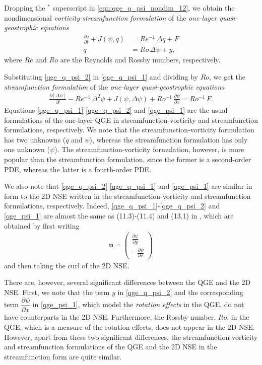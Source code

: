Dropping the $^*$ superscript in \eqref{eqn:qge_q_psi_nondim_12}, we obtain the
nondimensional {\it vorticity-streamfunction formulation} of the \emph{one-layer
quasi-geostrophic equations}
\begin{align}
  \frac{\partial q}{\partial t} + J(\psi , q) &= Re^{-1} \, \Delta q + F \label{qge_q_psi_1} \\
  q &= Ro \, \Delta \psi + y, \label{qge_q_psi_2}
\end{align}
where $Re$ and $Ro$ are the Reynolds and Rossby numbers, respectively.

Substituting \eqref{qge_q_psi_2} in \eqref{qge_q_psi_1} and dividing by $Ro$, we
get the {\it streamfunction formulation} of the \emph{one-layer quasi-geostrophic
equations}
\begin{align}
  \frac{\partial \left[ \Delta \psi \right]}{\partial t} - Re^{-1} \, \Delta^2 \psi + J(\psi
    , \Delta \psi) + Ro^{-1} \, \frac{\partial \psi}{\partial x} = Ro^{-1} \, F. \label{qge_psi_1}
\end{align}
Equations \eqref{qge_q_psi_1}-\eqref{qge_q_psi_2} and \eqref{qge_psi_1} are the
usual formulations of the one-layer QGE in streamfunction-vorticity and
streamfunction formulations, respectively. We note that the
streamfunction-vorticity formulation has two unknowns ($q$ and $\psi$), whereas
the streamfunction formulation has only one unknown ($\psi$). The
streamfunction-vorticity formulation, however, is more popular than the
streamfunction formulation, since the former is a second-order PDE, whereas the
latter is a fourth-order PDE.

We also note that \eqref{qge_q_psi_2}-\eqref{qge_q_psi_1} and \eqref{qge_psi_1}
are similar in form to the 2D NSE written in the streamfunction-vorticity and
streamfunction formulations, respectively.  Indeed,
\eqref{qge_q_psi_1}-\eqref{qge_q_psi_2} and \eqref{qge_psi_1} are almost the
same as (11.3)-(11.4) and (13.1) in \cite{Gunzburger89}, which are obtained by
first writing
\begin{align}
  \mathbf{u} = \begin{pmatrix} \frac{\partial \psi}{\partial y} \\[0.2cm]
      - \frac{\partial \psi}{\partial x}
    \end{pmatrix} \label{qge_psi_2}
\end{align}
and then taking the curl of the 2D NSE.

There are, however, several significant differences between the QGE and the 2D
NSE. First, we note that the term $y$ in \eqref{qge_q_psi_2} and the
corresponding term $\dfrac{\partial \psi}{\partial x}$ in \eqref{qge_psi_1},
which model the \emph{rotation effects} in the QGE, do not have counterparts in
the 2D NSE.  Furthermore, the Rossby number, $Ro$, in the QGE, which is a
measure of the rotation effects, does not appear in the 2D NSE.  However, apart
from these two significant differences, the streamfunction-vorticity and
streamfunction formulations of the QGE and the 2D NSE in the streamfunction form
are quite similar.


